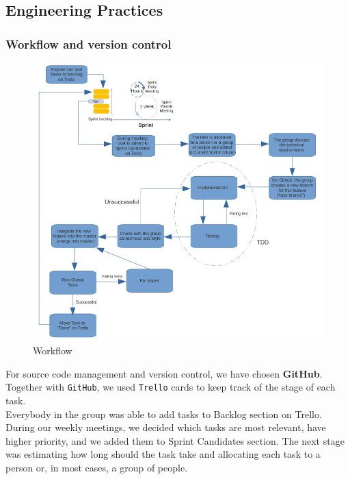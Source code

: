 \documentclass{article}
\begin{document}
\subsection{Engineering Practices}
\subsubsection{Workflow and version control}

\begin{figure}[H]

\centering

\includegraphics[scale=0.7]{workflow}
\caption{Workflow}
\end{figure}

	For source code management and version control, we have chosen \textbf{GitHub}. Together with \verb|GitHub|, we used \verb|Trello| cards to keep track of the stage of each task.\\
	
	Everybody in the group was able to add tasks to Backlog section on Trello. During our weekly meetings, we decided which tasks are most relevant, have higher priority, and we added them to Sprint Candidates section. The next stage was estimating how long should the task take and allocating each task to a person or, in most cases, a group of people. \\
	
\end{document}

